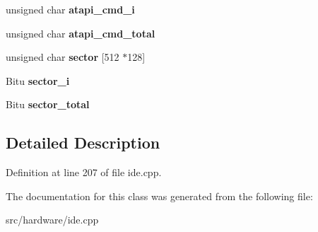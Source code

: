 \begin{DoxyCompactItemize}
\item 
\hypertarget{classIDEATAPICDROMDevice_a1e62a465becd556da27b8a060d8695fb}{unsigned char {\bfseries atapi\-\_\-cmd\-\_\-i}}\label{classIDEATAPICDROMDevice_a1e62a465becd556da27b8a060d8695fb}

\item 
\hypertarget{classIDEATAPICDROMDevice_a8cc1c7681f8c8c8e5ed93ef86995dd5a}{unsigned char {\bfseries atapi\-\_\-cmd\-\_\-total}}\label{classIDEATAPICDROMDevice_a8cc1c7681f8c8c8e5ed93ef86995dd5a}

\item 
\hypertarget{classIDEATAPICDROMDevice_a123cdf624128f5c142fc1f480e5ff91f}{unsigned char {\bfseries sector} \mbox{[}512 $\ast$128\mbox{]}}\label{classIDEATAPICDROMDevice_a123cdf624128f5c142fc1f480e5ff91f}

\item 
\hypertarget{classIDEATAPICDROMDevice_ad6b3e3413c5d7739939ca14eb1dff4b7}{Bitu {\bfseries sector\-\_\-i}}\label{classIDEATAPICDROMDevice_ad6b3e3413c5d7739939ca14eb1dff4b7}

\item 
\hypertarget{classIDEATAPICDROMDevice_a4a7e9b2a06f401201b6187679e2bbae5}{Bitu {\bfseries sector\-\_\-total}}\label{classIDEATAPICDROMDevice_a4a7e9b2a06f401201b6187679e2bbae5}

\end{DoxyCompactItemize}


\subsection{Detailed Description}


Definition at line 207 of file ide.\-cpp.



The documentation for this class was generated from the following file\-:\begin{DoxyCompactItemize}
\item 
src/hardware/ide.\-cpp\end{DoxyCompactItemize}
